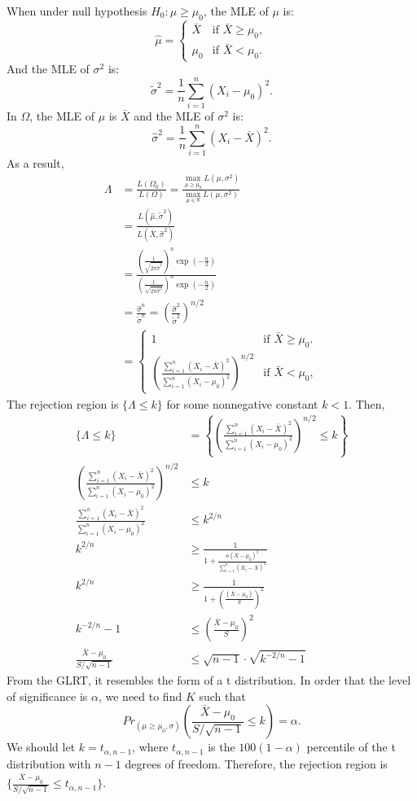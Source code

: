 \documentclass{article}
\begin{document}
When under null hypothesis $H_0: \mu \geq \mu_0$, the MLE of $\mu$ is:
\[
\hat{\mu} =
\begin{cases}
\bar{X} & \text{if } \bar{X} \geq \mu_0, \\
\mu_0 & \text{if } \bar{X} < \mu_0.
\end{cases}
\]
And the MLE of $\sigma^2$ is:
\[
\tilde{\sigma}^2 = \frac{1}{n} \sum_{i=1}^{n} (X_i - \mu_0)^2.
\]
In $\Omega$, the MLE of $\mu$ is $\bar{X}$ and the MLE of $\sigma^2$ is:
\[
\hat{\sigma}^2 = \frac{1}{n} \sum_{i=1}^{n} (X_i - \bar{X})^2.
\]
As a result,
\begin{align*}
\Lambda &= \frac{L(\Omega_0)}{L(\Omega)} = \frac{\underset{\mu \geq \mu_0}{\max} L(\mu, \sigma^2)}{\underset{\mu \in \mathbb{R}}{\max} L(\mu, \sigma^2)} \\
&= \frac{L(\hat{\mu}, \tilde{\sigma}^2)}{L(\bar{X}, \hat{\sigma}^2)} \\
&= \frac{\left(\frac{1}{\sqrt{2\pi\tilde{\sigma}^2}}\right)^n \exp(-\frac{n}{2})}{\left(\frac{1}{\sqrt{2\pi\hat{\sigma}^2}}\right)^n \exp(-\frac{n}{2})} \\
&= \frac{\hat{\sigma}^n}{\tilde{\sigma}^n} = (\frac{\hat{\sigma}^2}{\tilde{\sigma}^2})^{n/2} \\
&= \begin{cases}
1 & \text{if } \bar{X} \geq \mu_0. \\
\left(\frac{\sum_{i=1}^{n} (X_i - \bar{X})^2}{\sum_{i=1}^{n} (X_i - \mu_0)^2}\right)^{n/2} & \text{if } \bar{X} < \mu_0,
\end{cases}
\end{align*}
The rejection region is $\{\Lambda \leq k\}$ for some nonnegative constant $k < 1$. Then,
\begin{align*}
\{\Lambda \leq k\} &= \left\{\left(\frac{\sum_{i=1}^{n} (X_i - \bar{X})^2}{\sum_{i=1}^{n} (X_i - \mu_0)^2}\right)^{n/2} \leq k\right\} \\
\left(\frac{\sum_{i=1}^{n} (X_i - \bar{X})^2}{\sum_{i=1}^{n} (X_i - \mu_0)^2}\right)^{n/2} &\leq k \\
\frac{\sum_{i=1}^{n} (X_i - \bar{X})^2}{\sum_{i=1}^{n} (X_i - \mu_0)^2} &\leq k^{2/n} \\
k^{2/n} &\geq \frac{1}{1+\frac{n(\bar{X} - \mu_0)^2}{\sum_{i=1}^{n} (X_i - \bar{X})^2}} \\
k^{2/n} &\geq \frac{1}{1+(\frac{(\bar{X} - \mu_0)}{S})^2} \\
k^{-2/n} - 1 &\leq (\frac{\bar{X} - \mu_0}{S})^2 \\
\frac{\bar{X} - \mu_0}{S / \sqrt{n - 1}} &\leq \sqrt{n-1} \cdot \sqrt{k^{-2/n} - 1}
\end{align*}
From the GLRT, it resembles the form of a t distribution. In order that the level of significance is $\alpha$, we need to find $K$ such that
\[
Pr_{(\mu \geq \mu_0, \sigma)}(\frac{\bar{X} - \mu_0}{S / \sqrt{n - 1}} \leq k) = \alpha.
\]
We should let $k = t_{\alpha, n-1}$, where $t_{\alpha, n-1}$ is the $100(1-\alpha)$ percentile of the t distribution with $n-1$ degrees of freedom. Therefore, the rejection region is $\{\frac{\bar{X} - \mu_0}{S / \sqrt{n - 1}} \leq t_{\alpha, n-1}\}$.
\end{document}
